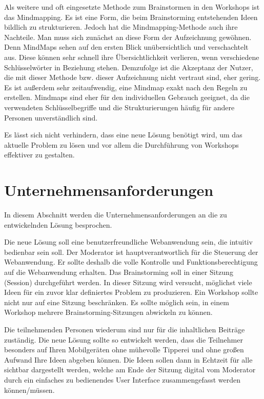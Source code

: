 Als weitere und oft eingesetzte Methode zum Brainstormen in den Workshops ist das Mindmapping. Es ist eine Form, die beim Brainstorming entstehenden Ideen bildlich zu strukturieren. Jedoch hat die Mindmapping-Methode auch ihre Nachteile. Man muss sich zunächst an diese Form der Aufzeichnung gewöhnen. Denn MindMaps sehen auf den ersten Blick unübersichtlich und verschachtelt aus. Diese können sehr schnell ihre Übersichtlichkeit verlieren, wenn verschiedene Schlüsselwörter in Beziehung stehen. Demzufolge ist die Akzeptanz der Nutzer, die mit dieser Methode bzw. dieser Aufzeichnung nicht vertraut sind, eher gering. Es ist außerdem sehr zeitaufwendig, eine Mindmap exakt nach den Regeln zu erstellen. Mindmaps sind eher für den individuellen Gebrauch geeignet, da die verwendeten Schlüsselbegriffe und die Strukturierungen häufig für andere Personen unverständlich sind.\bigskip

Es lässt sich nicht verhindern, dass eine neue Lösung benötigt wird, um das aktuelle Problem zu lösen und vor allem die Durchführung von Workshops effektiver zu gestalten.

\section{Unternehmensanforderungen}
\label{sec:unternehmensanforderungen}
In diesem Abschnitt werden die Unternehmensanforderungen an die zu entwickelnden Lösung besprochen.\bigskip

Die neue Lösung soll eine benutzerfreundliche Webanwendung sein, die intuitiv bedienbar sein soll. Der Moderator ist hauptverantwortlich für die Steuerung der Webanwendung. Er sollte deshalb die volle Kontrolle und Funktionsberechtigung auf die Webanwendung erhalten. Das Brainstorming soll in einer Sitzung (Session) durchgeführt werden. In dieser Sitzung wird versucht, möglichst viele Ideen für ein zuvor klar definiertes Problem zu produzieren. Ein Workshop sollte nicht nur auf eine Sitzung beschränken. Es sollte möglich sein, in einem Workshop mehrere Brainstorming-Sitzungen abwickeln zu können.\bigskip

Die teilnehmenden Personen wiederum sind nur für die inhaltlichen Beiträge zuständig. Die neue Lösung sollte so entwickelt werden, dass die Teilnehmer besonders auf Ihren Mobilgeräten ohne mühevolle Tipperei und ohne großen Aufwand Ihre Ideen abgeben können. Die Ideen sollen dann in Echtzeit für alle sichtbar dargestellt werden, welche am Ende der Sitzung digital vom Moderator durch ein einfaches zu bedienendes User Interface zusammengefasst werden können/müssen.\bigskip

